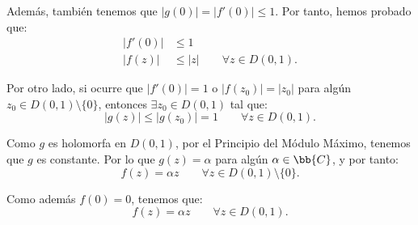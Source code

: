 \documentclass[12pt]{article}
\begin{document}
\begin{ejercicio}[2.5 puntos]
        Además, también tenemos que $|g(0)| = |f'(0)| \leq 1$. Por tanto, hemos probado que:
        \begin{align*}
            |f'(0)| &\leq 1\\
            |f(z)| &\leq |z| \qquad \forall z\in D(0, 1).
        \end{align*}


        Por otro lado, si ocurre que $|f'(0)| = 1$ o $|f(z_0)| = |z_0|$ para algún $z_0 \in D(0, 1) \setminus \{0\}$, entonces $\exists z_0\in D(0, 1)$ tal que:
        \begin{equation*}
            |g(z)|\leq |g(z_0)|=1\qquad \forall z\in D(0, 1).
        \end{equation*}

        Como $g$ es holomorfa en $D(0, 1)$, por el Principio del Módulo Máximo, tenemos que $g$ es constante. Por lo que $g(z) = \alpha$ para algún $\alpha\in \bb{C}$, y por tanto:
        \begin{equation*}
            f(z) = \alpha z\qquad \forall z\in D(0, 1)\setminus \{0\}.
        \end{equation*}

        Como además $f(0) = 0$, tenemos que:
        \begin{equation*}
            f(z) = \alpha z\qquad \forall z\in D(0, 1).
        \end{equation*}
    \end{ejercicio}
    
\end{document}
